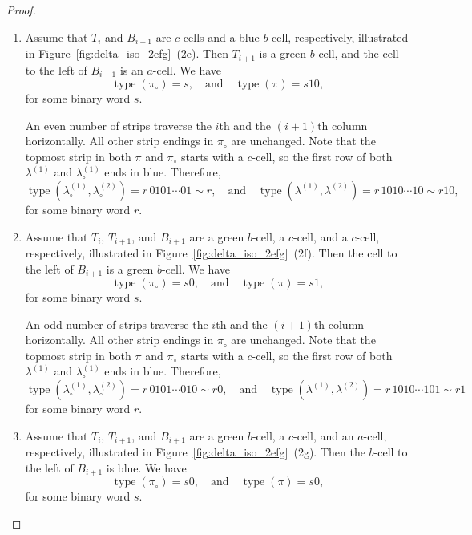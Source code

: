 \documentclass[11pt]{article}
\theoremstyle{definition}
\theoremstyle{remark}
\theoremstyle{definition}
\numberwithin{equation}{section}
\newcommand{\type}{\operatorname{type}}
\newcommand\qand{\quad\text{and}\quad}
\begin{document}
\begin{proof}
\begin{enumerate}[label=(2\alph*)]
\item Assume that \( T_i \) and \( B_{i+1} \) are \( c \)-cells and a
  blue \( b \)-cell, respectively, illustrated in
  Figure~\ref{fig:delta_iso_2efg}~(2e). Then \( T_{i+1} \) is a green
  \(b\)-cell, and the cell to the left of \( B_{i+1} \) is an
  \(a\)-cell. We have
  \[
    \type(\pi_\circ)=s, \qand \type(\pi)=s10,
  \]
  for some binary word \(s\).

  An even number of strips traverse the \(i\)th and the \((i+1)\)th
  column horizontally. All other strip endings in \(\pi_\circ\) are
  unchanged. Note that the topmost strip in both \(\pi\) and
  \(\pi_\circ\) starts with a \(c\)-cell, so the first row of both
  \(\lambda^{(1)}\) and \(\lambda_\circ^{(1)}\) ends in blue. Therefore,
  \[
    \type(\lambda_\circ^{(1)},\lambda_\circ^{(2)})=r\,0101\cdots01\sim r, \qand \type(\lambda^{(1)},\lambda^{(2)})=r\,1010\cdots10\sim r10,
  \]
  for some binary word \(r\).


\item Assume that \( T_i \), \( T_{i+1} \), and \( B_{i+1} \) are a green \( b \)-cell, a \( c \)-cell, and a \( c \)-cell, respectively,
  illustrated in Figure~\ref{fig:delta_iso_2efg}~(2f). Then the cell to the
  left of \( B_{i+1} \) is a green \(b\)-cell. We have
  \[
    \type(\pi_\circ)=s0, \qand \type(\pi)=s1,
  \]
  for some binary word \(s\).

  An odd number of strips traverse the \(i\)th and the \((i+1)\)th
  column horizontally. All other strip endings in \(\pi_\circ\) are
  unchanged. Note that the topmost strip in both \(\pi\) and
  \(\pi_\circ\) starts with a \(c\)-cell, so the first row of both
  \(\lambda^{(1)}\) and \(\lambda_\circ^{(1)}\) ends in blue. Therefore,
  \[
    \type(\lambda_\circ^{(1)},\lambda_\circ^{(2)})=r\,0101\cdots010\sim r0, \qand \type(\lambda^{(1)},\lambda^{(2)})=r\,1010\cdots101\sim r1
  \]
  for some binary word \(r\). 


\item Assume that \( T_i \), \( T_{i+1} \), and \( B_{i+1} \) are a green \( b \)-cell, a \( c \)-cell, and an \( a \)-cell, respectively,
  illustrated in Figure~\ref{fig:delta_iso_2efg}~(2g). Then the \(b\)-cell to
  the left of \( B_{i+1} \) is blue. We have
  \[
    \type(\pi_\circ)=s0, \qand \type(\pi)=s0,
  \]
  for some binary word \(s\).


\end{enumerate}
\end{proof}
\end{document}
